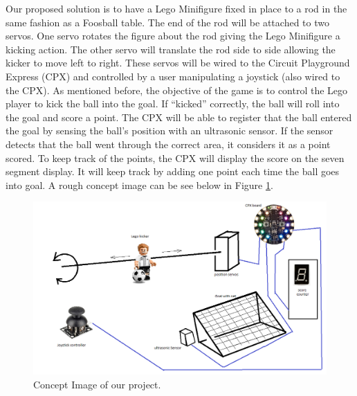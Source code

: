 \documentclass[12pt]{article}
\begin{document}


Our proposed solution is to have a Lego Minifigure fixed in place to a rod in the same fashion as a Foosball table.
The end of the rod will be attached to two servos. One servo rotates the figure about the rod giving the Lego
Minifigure a kicking action. The other servo will translate the rod side to side allowing the kicker to move left to 
right. These servos will be wired to the Circuit Playground Express (CPX) and controlled by a user manipulating a 
joystick (also wired to the CPX). As mentioned before, the objective of the game is to control the Lego player to kick the ball into the 
goal. If ``kicked'' correctly, the ball will roll into the goal and score a point. The CPX will be able to register
that the ball entered the goal by sensing the ball's position with an ultrasonic sensor. If the sensor detects that
the ball went through the correct area, it considers it as a point scored. To keep track of the points, the CPX will 
display the score on the seven segment display. It will keep track by adding one point each time the ball goes into 
goal. A rough concept image can be see below in Figure \ref{fig:concept_image}.



\begin{figure}[h]
\centering
\includegraphics[width=6.5in]{images/Concept_image.png}
\caption{Concept Image of our project.}
\label{fig:concept_image}
\end{figure}
\end{document}
